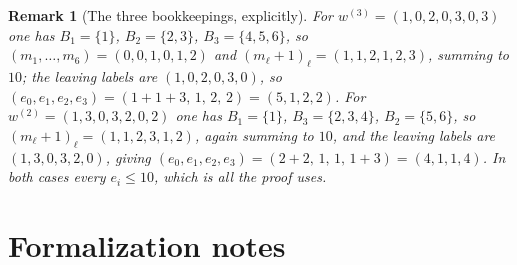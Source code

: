 \documentclass[11pt]{article}
\newtheorem{remark}[theorem]{Remark}
\begin{document}
\begin{remark}[The three bookkeepings, explicitly]
  For $w^{(3)}=(1,0,2,0,3,0,3)$ one has $B_1=\{1\}$, $B_2=\{2,3\}$,
  $B_3=\{4,5,6\}$, so $(m_1,\dots,m_6)=(0,0,1,0,1,2)$ and
  $(m_\ell+1)_\ell=(1,1,2,1,2,3)$, summing to $10$; the leaving labels are
  $(1,0,2,0,3,0)$, so $(e_0,e_1,e_2,e_3)=(1+1+3,\,1,\,2,\,2)=(5,1,2,2)$.
  For $w^{(2)}=(1,3,0,3,2,0,2)$ one has $B_1=\{1\}$, $B_3=\{2,3,4\}$,
  $B_2=\{5,6\}$, so $(m_\ell+1)_\ell=(1,1,2,3,1,2)$, again summing to $10$, and
  the leaving labels are $(1,3,0,3,2,0)$, giving
  $(e_0,e_1,e_2,e_3)=(2+2,\,1,\,1,\,1+3)=(4,1,1,4)$.  In both cases every
  $e_i\leq10$, which is all the proof uses.
\end{remark}

\section{Formalization notes}
\label{sec:lean}
\end{document}
